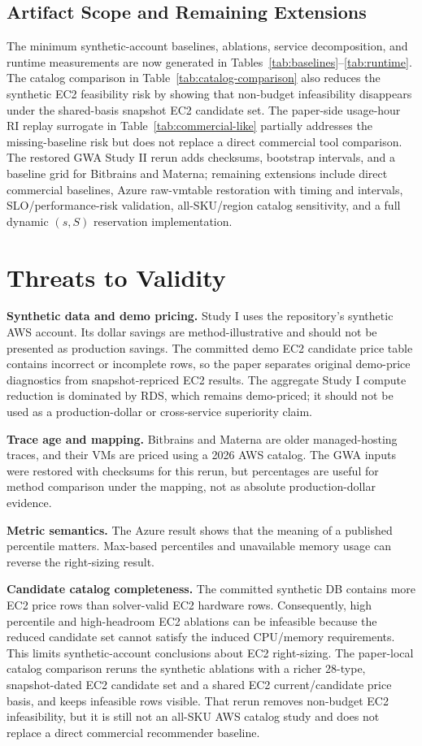 \documentclass[conference]{IEEEtran}
\begin{document}
\subsection{Artifact Scope and Remaining Extensions}
The minimum synthetic-account baselines, ablations, service decomposition,
and runtime measurements are now generated in
Tables~\ref{tab:baselines}--\ref{tab:runtime}. The catalog comparison in
Table~\ref{tab:catalog-comparison} also reduces the
synthetic EC2 feasibility risk by showing that non-budget infeasibility
disappears under the shared-basis snapshot EC2 candidate set. The
paper-side usage-hour RI replay surrogate in Table~\ref{tab:commercial-like}
partially
addresses the missing-baseline risk but does not replace a direct commercial
tool comparison. The restored GWA Study II rerun adds checksums, bootstrap
intervals, and a baseline grid for Bitbrains and Materna; remaining extensions
include direct commercial baselines, Azure raw-vmtable restoration with timing
and intervals, SLO/performance-risk validation, all-SKU/region catalog
sensitivity, and a full dynamic $(s,S)$ reservation implementation.

\section{Threats to Validity}

\textbf{Synthetic data and demo pricing.} Study I uses the repository's
synthetic AWS account. Its dollar savings are method-illustrative and should
not be presented as production savings. The committed demo EC2 candidate price
table contains incorrect or incomplete rows, so the paper separates original
demo-price diagnostics from snapshot-repriced EC2 results. The aggregate
Study I compute reduction is dominated by RDS, which remains demo-priced; it
should not be used as a production-dollar or cross-service superiority claim.

\textbf{Trace age and mapping.} Bitbrains and Materna are older managed-hosting
traces, and their VMs are priced using a 2026 AWS catalog. The GWA inputs were
restored with checksums for this rerun, but percentages are useful for method
comparison under the mapping, not as absolute production-dollar evidence.

\textbf{Metric semantics.} The Azure result shows that the meaning of a
published percentile matters. Max-based percentiles and unavailable memory
usage can reverse the right-sizing result.

\textbf{Candidate catalog completeness.} The committed synthetic DB contains
more EC2 price rows than solver-valid EC2 hardware rows. Consequently, high
percentile and high-headroom EC2 ablations can be infeasible because the
reduced candidate set cannot satisfy the induced CPU/memory requirements. This
limits synthetic-account conclusions about EC2 right-sizing. The paper-local
catalog comparison reruns the synthetic ablations with a richer 28-type,
snapshot-dated EC2 candidate set and a shared EC2 current/candidate price
basis, and keeps infeasible rows visible. That rerun removes non-budget EC2
infeasibility, but it is still not an all-SKU AWS catalog study and does not
replace a direct commercial recommender baseline.
\end{document}
